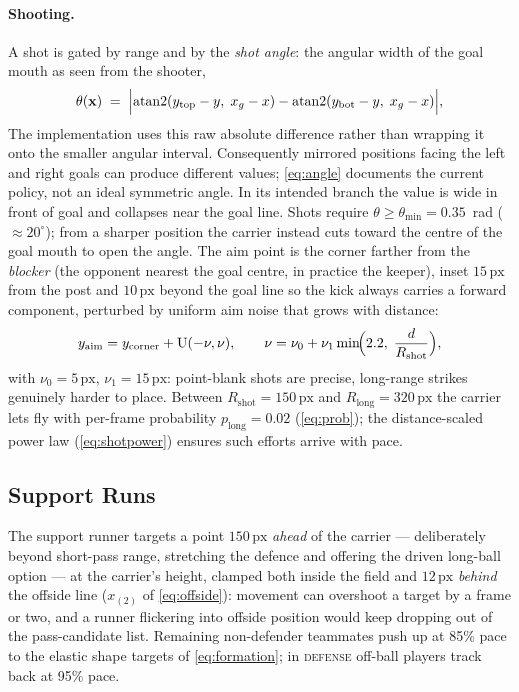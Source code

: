 \documentclass[10pt,twocolumn]{article}
\newcommand{\px}{\ensuremath{\,\mathrm{px}}}
\begin{document}
\paragraph{Shooting.} A shot is gated by range and by the \emph{shot
angle}: the angular width of the goal mouth as seen from the shooter,
\begin{equation}\label{eq:angle}
\theta(\mathbf x) \;=\;
\Bigl| \operatorname{atan2}(y_{\text{top}} - y,\; x_g - x)
     - \operatorname{atan2}(y_{\text{bot}} - y,\; x_g - x) \Bigr| ,
\end{equation}
The implementation uses this raw absolute difference rather than wrapping it
onto the smaller angular interval. Consequently mirrored positions facing the
left and right goals can produce different values; \cref{eq:angle} documents
the current policy, not an ideal symmetric angle. In its intended branch the
value is wide in front of goal and collapses near the goal line. Shots
require $\theta \ge \theta_{\min} = 0.35$~rad ($\approx 20^{\circ}$); from
a sharper position the carrier instead cuts toward the centre of the goal
mouth to open the angle. The aim point is the corner farther from the
\emph{blocker} (the opponent nearest the goal centre, in practice the
keeper), inset $15\px$ from the post and $10\px$ beyond the goal line so
the kick always carries a forward component, perturbed by uniform aim
noise that grows with distance:
\begin{equation}\label{eq:aim}
y_{\text{aim}} = y_{\text{corner}} + \mathrm{U}(-\nu, \nu),
\qquad
\nu = \nu_0 + \nu_1 \min\!\Bigl(2.2,\; \frac{d}{R_{\text{shot}}}\Bigr),
\end{equation}
with $\nu_0 = 5\px$, $\nu_1 = 15\px$: point-blank shots are precise,
long-range strikes genuinely harder to place. Between
$R_{\text{shot}} = 150\px$ and $R_{\text{long}} = 320\px$ the carrier lets
fly with per-frame probability $p_{\text{long}} = 0.02$
(\cref{eq:prob}); the distance-scaled power law (\cref{eq:shotpower})
ensures such efforts arrive with pace.

\subsection{Support Runs}\label{sec:support}

The support runner targets a point $150\px$ \emph{ahead} of the carrier ---
deliberately beyond short-pass range, stretching the defence and offering
the driven long-ball option --- at the carrier's height, clamped both
inside the field and $12\px$ \emph{behind} the offside line
($x_{(2)}$ of \cref{eq:offside}): movement can overshoot a target by a
frame or two, and a runner flickering into offside position would keep
dropping out of the pass-candidate list. Remaining non-defender teammates
push up at 85\% pace to the elastic shape targets of \cref{eq:formation};
in \textsc{defense} off-ball players track back at 95\% pace.
\end{document}
